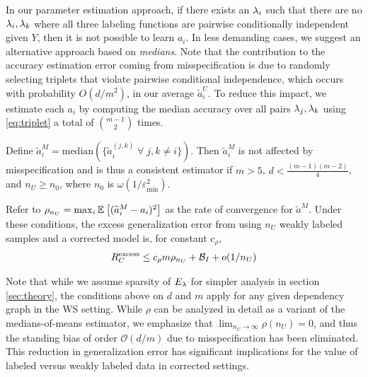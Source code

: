 In our parameter estimation approach, if there exists an $\lambda_i$ such that there are no $\lambda_i, \lambda_k$ where all three labeling functions are pairwise conditionally independent given $Y$, then it is not possible to learn  $a_i$. In less demanding cases, %
we suggest an alternative approach based on \emph{medians}. Note that the contribution to the accuracy estimation error coming from misspecification is due to randomly selecting triplets that violate pairwise conditional independence, which occurs with probability $O(d/m^2)$, 
in our average $\widetilde{a}_i^U$. To reduce this impact, we estimate each $a_i$ by computing the median accuracy over all pairs $\lambda_j, \lambda_k$ using \eqref{eq:triplet} a total of ${m - 1 \choose 2}$ times.
\begin{proposition}
Define $\widetilde{a}_i^M = \mathrm{median}(\{\widetilde{a}_i^{(j, k)} \; \forall \; j, k \neq i \})$. Then $\widetilde{a}_i^M$ is not affected by misspecification and is thus a consistent estimator if $m > 5$, $d < \frac{(m - 1)(m - 2)}{4}$, and $n_U \ge n_0$, where $n_0$ is $\omega(1/\varepsilon_{\min}^2)$.

Refer to $\rho_{n_U} = \max_i \mathbb{E}_{}\left[(\widetilde{a}_i^M - a_i)^2\right]$ as the rate of convergence for $\widetilde{a}^M$. Under these conditions, the excess generalization error from using $n_U$ weakly labeled samples and a corrected model is, for constant $c_\rho$,
\begin{align}
    R_C^{\mathrm{excess}} \le c_\rho m  \rho_{n_U} + \mathcal{B}_I + o(1/n_U)
\end{align}
\label{prop:medians}
\end{proposition}

Note that while we assume sparsity of $E_{\lambda}$ for simpler analysis in section \ref{sec:theory}, the conditions above on $d$ and $m$ apply for any given dependency graph in the WS setting. While $\rho$ can be analyzed in detail as a variant of the medians-of-means estimator, we emphasize that $\lim_{n_U \rightarrow \infty} \rho(n_U) = 0$, and thus the standing bias of order $\mathcal{O}(d/m)$ due to misspecification has been eliminated. This reduction in generalization error has significant implications for the value of labeled versus weakly labeled data in corrected settings. %

